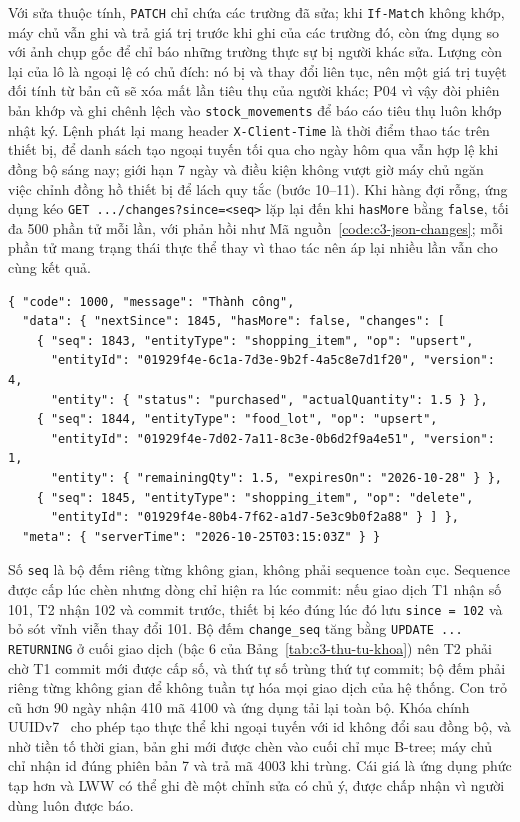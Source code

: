 Với sửa thuộc tính, \texttt{PATCH} chỉ chứa các trường đã sửa; khi \texttt{If-Match} không khớp, máy chủ vẫn ghi và trả giá trị trước khi ghi của các trường đó, còn ứng dụng so với ảnh chụp gốc để chỉ báo những trường thực sự bị người khác sửa. Lượng còn lại của lô là ngoại lệ có chủ đích: nó bị  và  thay đổi liên tục, nên một giá trị tuyệt đối tính từ bản cũ sẽ xóa mất lần tiêu thụ của người khác; P04 vì vậy đòi phiên bản khớp và ghi chênh lệch vào \texttt{stock\_movements} để báo cáo tiêu thụ luôn khớp nhật ký. Lệnh phát lại mang header \texttt{X-Client-Time} là thời điểm thao tác trên thiết bị, để danh sách tạo ngoại tuyến tối qua cho ngày hôm qua vẫn hợp lệ khi đồng bộ sáng nay; giới hạn 7 ngày và điều kiện không vượt giờ máy chủ ngăn việc chỉnh đồng hồ thiết bị để lách quy tắc (bước 10--11). Khi hàng đợi rỗng, ứng dụng kéo \texttt{GET .../changes?since=<seq>} lặp lại đến khi \texttt{hasMore} bằng \texttt{false}, tối đa 500 phần tử mỗi lần, với phản hồi như Mã nguồn~\ref{code:c3-json-changes}; mỗi phần tử mang trạng thái thực thể thay vì thao tác nên áp lại nhiều lần vẫn cho cùng kết quả.

\begin{Verbatim}
{ "code": 1000, "message": "Thành công",
  "data": { "nextSince": 1845, "hasMore": false, "changes": [
    { "seq": 1843, "entityType": "shopping_item", "op": "upsert",
      "entityId": "01929f4e-6c1a-7d3e-9b2f-4a5c8e7d1f20", "version": 4,
      "entity": { "status": "purchased", "actualQuantity": 1.5 } },
    { "seq": 1844, "entityType": "food_lot", "op": "upsert",
      "entityId": "01929f4e-7d02-7a11-8c3e-0b6d2f9a4e51", "version": 1,
      "entity": { "remainingQty": 1.5, "expiresOn": "2026-10-28" } },
    { "seq": 1845, "entityType": "shopping_item", "op": "delete",
      "entityId": "01929f4e-80b4-7f62-a1d7-5e3c9b0f2a88" } ] },
  "meta": { "serverTime": "2026-10-25T03:15:03Z" } }
\end{Verbatim}

Số \texttt{seq} là bộ đếm riêng từng không gian, không phải sequence toàn cục. Sequence được cấp lúc chèn nhưng dòng chỉ hiện ra lúc commit: nếu giao dịch T1 nhận số 101, T2 nhận 102 và commit trước, thiết bị kéo đúng lúc đó lưu \texttt{since = 102} và bỏ sót vĩnh viễn thay đổi 101. Bộ đếm \texttt{change\_seq} tăng bằng \texttt{UPDATE ... RETURNING} ở cuối giao dịch (bậc 6 của Bảng~\ref{tab:c3-thu-tu-khoa}) nên T2 phải chờ T1 commit mới được cấp số, và thứ tự số trùng thứ tự commit; bộ đếm phải riêng từng không gian để không tuần tự hóa mọi giao dịch của hệ thống. Con trỏ cũ hơn 90 ngày nhận 410 mã 4100 và ứng dụng tải lại toàn bộ. Khóa chính UUIDv7~\cite{rfc9562} cho phép tạo thực thể khi ngoại tuyến với id không đổi sau đồng bộ, và nhờ tiền tố thời gian, bản ghi mới được chèn vào cuối chỉ mục B-tree; máy chủ chỉ nhận id đúng phiên bản 7 và trả mã 4003 khi trùng. Cái giá là ứng dụng phức tạp hơn và LWW có thể ghi đè một chỉnh sửa có chủ ý, được chấp nhận vì người dùng luôn được báo.


